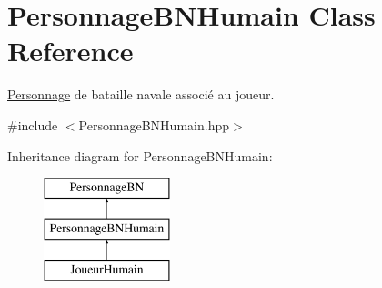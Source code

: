 \hypertarget{classPersonnageBNHumain}{\section{Personnage\-B\-N\-Humain Class Reference}
\label{classPersonnageBNHumain}
}


\hyperlink{classPersonnage}{Personnage} de bataille navale associé au joueur.  




{\ttfamily \#include $<$Personnage\-B\-N\-Humain.\-hpp$>$}

Inheritance diagram for Personnage\-B\-N\-Humain\-:\begin{figure}[H]
\begin{center}
\leavevmode
\includegraphics[height=3.000000cm]{classPersonnageBNHumain}
\end{center}
\end{figure}
